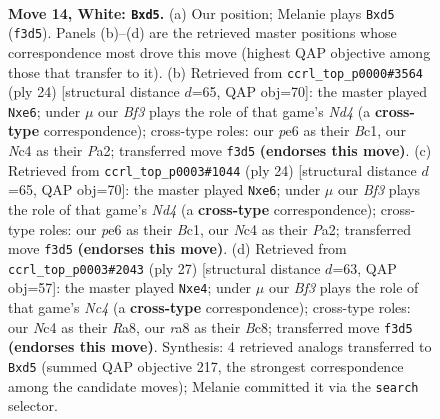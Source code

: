 \documentclass[11pt]{article}
\begin{document}
\clearpage

\begin{figure}[p]\centering
\begin{subfigure}{0.46\textwidth}\centering
\resizebox{\linewidth}{!}{%
\newchessgame
\chessboard[
  setfen={r1bqr1k1/1pp2p1p/2n1p3/p2n2b1/2NP4/4PBP1/PP3P2/RNBQR1K1 w - - 0 14},
  showmover=false,
  pgfstyle=straightmove, color=movearrow, markmove={f3-d5}
]}
\caption{}
\end{subfigure}\hfill
\begin{subfigure}{0.46\textwidth}\centering
\resizebox{\linewidth}{!}{%
\newchessgame
\chessboard[
  setfen={r2qr1k1/ppp2pb1/3pbnpp/2n5/2PNP3/2N2PPP/PP4B1/R1BQR1K1 w - - 1 13},
  showmover=false,
  pgfstyle=straightmove, color=movearrow, markmove={d4-e6}
]}
\caption{}
\end{subfigure}
\\[4pt]
\begin{subfigure}{0.46\textwidth}\centering
\resizebox{\linewidth}{!}{%
\newchessgame
\chessboard[
  setfen={r2qr1k1/ppp2pb1/3pbnpp/2n5/2PNP3/2N2PPP/PP4B1/R1BQR1K1 w - - 1 13},
  showmover=false,
  pgfstyle=straightmove, color=movearrow, markmove={d4-e6}
]}
\caption{}
\end{subfigure}\hfill
\begin{subfigure}{0.46\textwidth}\centering
\resizebox{\linewidth}{!}{%
\newchessgame
\chessboard[
  setfen={r1b1r1k1/pp2qpbp/2pp2p1/2n5/2PNN3/4B1PP/PPQ2PB1/R3R1K1 b - - 0 14},
  showmover=false,
  pgfstyle=straightmove, color=movearrow, markmove={c5-e4}
]}
\caption{}
\end{subfigure}
\caption{\textbf{Move 14, White: \texttt{Bxd5}.} (a) Our position; Melanie plays \texttt{Bxd5} (\texttt{f3d5}). Panels (b)--(d) are the retrieved master positions whose correspondence most drove this move (highest QAP objective among those that transfer to it). (b) Retrieved from \texttt{ccrl\_top\_p0000\#3564} (ply 24) [structural distance $d$=65, QAP obj=70]: the master played \texttt{Nxe6}; under $\mu$ our \emph{Bf3} plays the role of that game's \emph{Nd4} (a \textbf{cross-type} correspondence); cross-type roles: our \emph{p}e6 as their \emph{B}c1, our \emph{N}c4 as their \emph{P}a2; transferred move \texttt{f3d5} \textbf{(endorses this move)}. (c) Retrieved from \texttt{ccrl\_top\_p0003\#1044} (ply 24) [structural distance $d$=65, QAP obj=70]: the master played \texttt{Nxe6}; under $\mu$ our \emph{Bf3} plays the role of that game's \emph{Nd4} (a \textbf{cross-type} correspondence); cross-type roles: our \emph{p}e6 as their \emph{B}c1, our \emph{N}c4 as their \emph{P}a2; transferred move \texttt{f3d5} \textbf{(endorses this move)}. (d) Retrieved from \texttt{ccrl\_top\_p0003\#2043} (ply 27) [structural distance $d$=63, QAP obj=57]: the master played \texttt{Nxe4}; under $\mu$ our \emph{Bf3} plays the role of that game's \emph{Nc4} (a \textbf{cross-type} correspondence); cross-type roles: our \emph{N}c4 as their \emph{R}a8, our \emph{r}a8 as their \emph{B}c8; transferred move \texttt{f3d5} \textbf{(endorses this move)}. Synthesis: 4 retrieved analogs transferred to \texttt{Bxd5} (summed QAP objective 217, the strongest correspondence among the candidate moves); Melanie committed it via the \texttt{search} selector.}

\end{figure}
\end{document}
